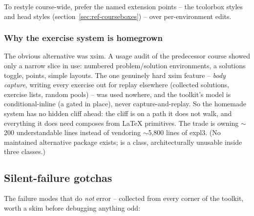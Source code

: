 To restyle course-wide, prefer the named extension points -- the
 tcolorbox styles and  head styles
(section~\ref{sec:ref-courseboxes}) -- over per-environment edits.

\subsubsection*{Why the exercise system is homegrown}

The obvious alternative was xsim. A usage audit of the predecessor
course showed only a narrow slice in use: numbered problem/solution
environments, a solutions toggle, points, simple layouts. The one
genuinely hard xsim feature -- \emph{body capture}, writing every
exercise out for replay elsewhere (collected solutions, exercise lists,
random pools) -- was used nowhere, and the toolkit's model is
conditional-inline (a gated  in place), never
capture-and-replay. So the homemade system has no hidden cliff ahead:
the cliff is on a path it does not walk, and everything it does need
composes from LaTeX primitives. The trade is owning $\sim$200
understandable lines instead of vendoring $\sim$5{,}800 lines of expl3.
(No maintained alternative package exists;  is a class,
architecturally unusable inside three classes.)

\subsection{Silent-failure gotchas}\label{sec:gotchas}

The failure modes that do \emph{not} error -- collected from every
corner of the toolkit, worth a skim before debugging anything odd:


